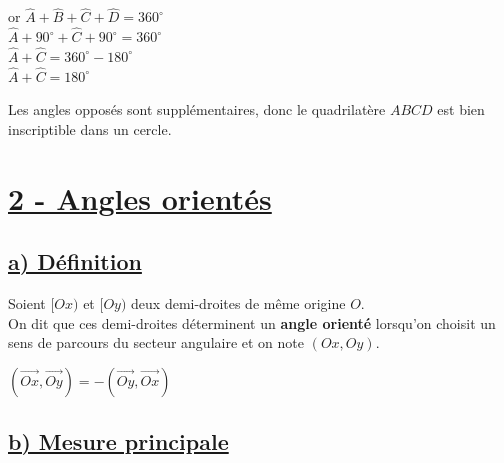 \documentclass[12pt,a4paper]{article}
\begin{document}
\vspace{0.5em}

\noindent or $\hat{A} + \hat{B} + \hat{C} + \hat{D} = 360^{\circ}$ \\
$\hat{A} + 90^{\circ} + \hat{C} + 90^{\circ} = 360^{\circ}$ \\
$\hat{A} + \hat{C} = 360^{\circ} - 180^{\circ}$ \\
$\hat{A} + \hat{C} = 180^{\circ}$

\vspace{1em}

\noindent Les angles opposés sont supplémentaires, donc le quadrilatère $ABCD$ est bien inscriptible dans un cercle.

\section*{%
    \color{monRouge} \underline{2 - Angles orientés}%
}

\subsection*{%
    \color{monRouge} \underline{a) Définition}%
}

\noindent Soient $[Ox)$ et $[Oy)$ deux demi-droites de même origine $O$. \\
On dit que ces demi-droites déterminent un \textbf{angle orienté} lorsqu'on choisit un sens de parcours du secteur angulaire et on note \textcolor{monRouge}{$(Ox, Oy)$}.

\begin{center}
\end{center}

\noindent \textcolor{monRouge}{$(\overrightarrow{Ox}, \overrightarrow{Oy}) = -(\overrightarrow{Oy}, \overrightarrow{Ox})$}

\subsection*{%
    \color{monRouge} \underline{b) Mesure principale}%
}
\end{document}
